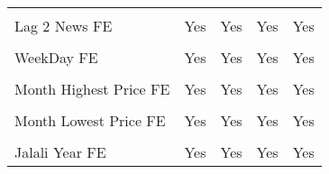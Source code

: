 \documentclass[border=0.2cm]{standalone}
\begin{document}
\begin{tabular}{lcccc}
    \vspace{4pt}           &                                                &                                                &                                                &                                                \\
    Lag 2 News FE          & Yes                                            & Yes                                            & Yes                                            & Yes                                            \\
    \vspace{4pt}           &                                                &                                                &                                                &                                                \\
    WeekDay FE             & Yes                                            & Yes                                            & Yes                                            & Yes                                            \\
    \vspace{4pt}           &                                                &                                                &                                                &                                                \\
    Month Highest Price FE & Yes                                            & Yes                                            & Yes                                            & Yes                                            \\
    \vspace{4pt}           &                                                &                                                &                                                &                                                \\
    Month Lowest Price FE  & Yes                                            & Yes                                            & Yes                                            & Yes                                            \\
    \vspace{4pt}           &                                                &                                                &                                                &                                                \\
    Jalali Year FE         & Yes                                            & Yes                                            & Yes                                            & Yes                                            \\

\end{tabular}
\end{document}
